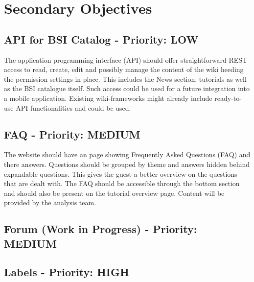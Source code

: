 \chapter{Secondary Objectives}
\section{API for BSI Catalog - Priority: LOW}
The application programming interface (API) should offer straightforward REST access to read, create, edit and possibly manage the content of the wiki heeding the permission settings in place.
This includes the News section, tutorials as well as the BSI catalogue itself.
Such access could be used for a future integration into a mobile application.
Existing wiki-frameworks might already include ready-to-use API functionalities and could be used.


\section{FAQ - Priority: MEDIUM}
\begin{tcolorbox}[breakable,colback=red!14,colframe=red!40!black,title=UPDATE 19/11/2017]
The website should have an page showing Frequently Asked Questions (FAQ) and there answers.
Questions should be grouped by theme and answers hidden behind expandable questions. 
This gives the guest a better overview on the questions that are dealt with.
The FAQ should be accessible through the bottom section and should also be present on the tutorial overview page.
Content will be provided by the analysis team.
\end{tcolorbox}


\section{Forum (Work in Progress) - Priority: MEDIUM}



\section{Labels - Priority: HIGH}
 
